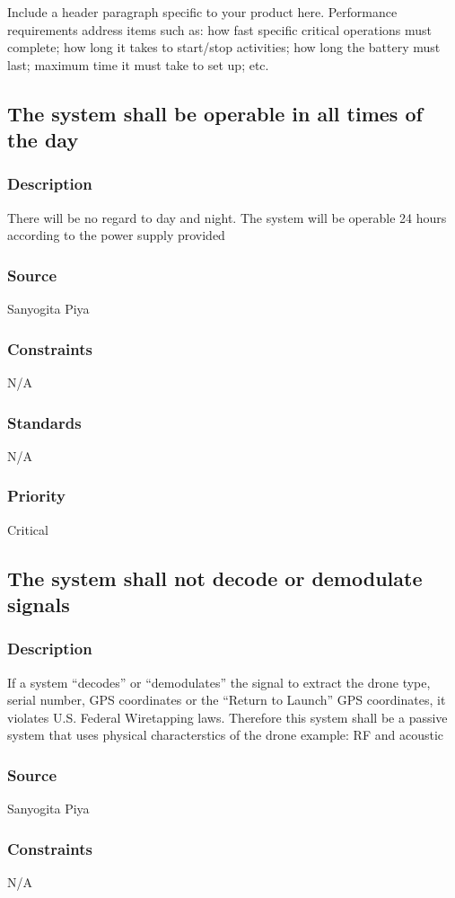 Include a header paragraph specific to your product here. Performance requirements address items such as: how fast specific critical operations must complete; how long it takes to start/stop activities; how long the battery must last; maximum time it must take to set up; etc.

\subsection{The system shall be operable in all times of the day}
\subsubsection{Description}
There will be no regard to day and night. The system will be operable 24 hours according to the power supply provided
\subsubsection{Source}
Sanyogita Piya
\subsubsection{Constraints}
N/A
\subsubsection{Standards}
N/A
\subsubsection{Priority}
Critical

\subsection{The system shall not decode or demodulate signals}
\subsubsection{Description}
If a system “decodes” or “demodulates” the signal to extract the drone type, serial number, GPS coordinates or the “Return to Launch” GPS coordinates, it violates U.S. Federal Wiretapping laws. Therefore this system shall be a passive system that uses physical characterstics of the drone example: RF and acoustic
\subsubsection{Source}
Sanyogita Piya
\subsubsection{Constraints}
N/A
